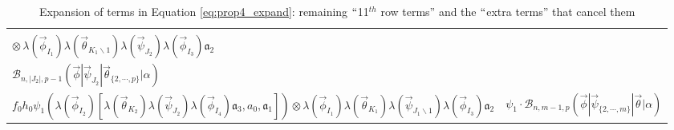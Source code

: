 \begin{landscape}
\begin{center}
\begin{table}
\begin{tabular}{ p{5.3in} | p{2.2in} }
    \breakcell{$f_0\theta_1( \lambda(\vec{\psi}_{J_1}) \lambda(\vec{\phi}_{I_2}) [
      \lambda(\vec{\theta}_{K_2}) \lambda(\vec{\psi}_{J_3}) \lambda(\vec{\phi}_{I_4})
      \mathfrak{a}_3, a_0, \mathfrak{a}_1]) \otimes$\\
      $\otimes\, \lambda(\vec{\phi}_{I_1}) \lambda(\vec{\theta}_{K_1 \backslash 1}) 
      \lambda(\vec{\psi}_{J_2}) \lambda(\vec{\phi}_{I_3}) \mathfrak{a}_2$} &
    \breakcell{$\theta_1 \{\vec{\psi}_{J_1}\} \cdot$\\
     $\mathcal{B}_{n, |J_2|, p-1}
     (\vec{\phi} | \vec{\psi}_{J_2} | \vec{\theta}_{\{2,\cdots,p\}} | \alpha)$} \\ \hline

    $f_0h_0\psi_1( \lambda(\vec{\phi}_{I_2}) [
      \lambda(\vec{\theta}_{K_2}) \lambda(\vec{\psi}_{J_2}) \lambda(\vec{\phi}_{I_4})
      \mathfrak{a}_3, a_0, \mathfrak{a}_1])
      \otimes \lambda(\vec{\phi}_{I_1}) \lambda(\vec{\theta}_{K_1}) 
      \lambda(\vec{\psi}_{J_1 \backslash 1}) \lambda(\vec{\phi}_{I_3}) \mathfrak{a}_2$ & 
    $\psi_1 \cdot
     \mathcal{B}_{n, m-1, p}
     (\vec{\phi} | \vec{\psi}_{\{2,\cdots,m\}} | \vec{\theta} | \alpha)$ \\ \hline

    \hline
  \end{tabular}
\caption{Expansion of terms in Equation \ref{eq:prop4_expand}: 
remaining $``$11$^{th}$ row terms'' and the $``$extra terms''
that cancel them}
\label{table:t42}
\end{table}  
\end{center}
\end{landscape}